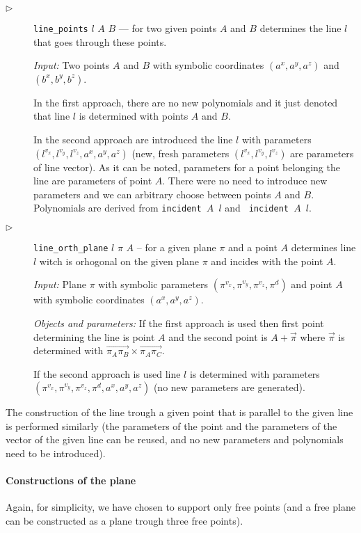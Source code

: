 \documentclass[final,1p,times,authoryear]{elsarticle}
\begin{document}
\begin{description}
\item[$\triangleright$] {\tt line\_points} $l$ $A$ $B$ --- for two
  given points $A$ and $B$ determines the line $l$ that goes through
  these points.

  {\em Input:} Two points $A$ and $B$ with symbolic coordinates $(a^x,
  a^y, a^z)$ and $(b^x, b^y, b^z)$.

  In the first approach, there are no new polynomials and it just
  denoted that line $l$ is determined with points $A$ and $B$.

  In the second approach are introduced the line $l$ with parameters
  $(l^{v_x}, l^{v_y}, l^{v_z}, a^x, a^y, a^z)$ (new, fresh parameters
  $(l^{v_x}, l^{v_y}, l^{v_z})$ are parameters of line vector). As it
  can be noted, parameters for a point belonging the line are
  parameters of point $A$. There were no need to introduce new
  parameters and we can arbitrary choose between points $A$ and
  $B$. Polynomials are derived from {\tt incident $A$ $l$} and {\tt
    incident $A$ $l$}.

\item[$\triangleright$] {\tt line\_orth\_plane} $l$ $\pi$ $A$ -- for a
  given plane $\pi$ and a point $A$ determines line $l$ witch is
  orhogonal on the given plane $\pi$ and incides with the point $A$.

{\em Input:} Plane $\pi$ with symbolic parameters $(\pi^{v_x},
\pi^{v_y}, \pi^{v_z}, \pi^{d})$ and point $A$ with symbolic
coordinates $(a^x, a^y, a^z)$.

{\em Objects and parameters:} If the first approach is used then first
point determining the line is point $A$ and the second point is $A +
\overrightarrow{\pi}$ where $\overrightarrow{\pi}$ is determined with
$\overrightarrow{\pi_A\pi_B} \times \overrightarrow{\pi_A\pi_C}$.

If the second approach is used line $l$
is determined with parameters $(\pi^{v_x}, \pi^{v_y}, \pi^{v_z},
\pi^{d}, a^x, a^y, a^z)$ (no new parameters are generated).
\end{description}

The construction of the line trough a given point that is parallel to
the given line is performed similarly (the parameters of the point and
the parameters of the vector of the given line can be reused, and no
new parameters and polynomials need to be introduced).


\paragraph{Constructions of the plane}
Again, for simplicity, we have chosen to support only free points (and
a free plane can be constructed as a plane trough three free points).
\end{document}

